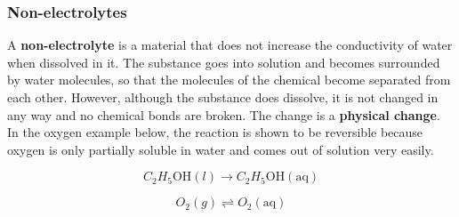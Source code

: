             \subsubsection{ Non-electrolytes}
            \nopagebreak
        \label{m38720*id339146}A \textbf{non-electrolyte} is a material that does not increase the conductivity of water when dissolved in it. The substance goes into solution and becomes surrounded by water molecules, so that the molecules of the chemical become separated from each other. However, although the substance does dissolve, it is not changed in any way and no chemical bonds are broken. The change is a \textbf{physical change}. In the oxygen example below, the reaction is shown to be reversible because oxygen is only partially soluble in water and comes out of solution very easily.\par 
        \label{m38720*id339165}\nopagebreak\noindent{}
          
    \begin{equation}
    {C}_{2}{H}_{5}\mathrm{OH}\left(l\right)\to {C}_{2}{H}_{5}\mathrm{OH}\left(\mathrm{aq}\right)\tag{17.7}
      \end{equation}
        \label{m38720*id339233}\nopagebreak\noindent{}
          
    \begin{equation}
    {O}_{2}\left(g\right)⇌{O}_{2}\left(\mathrm{aq}\right)\tag{17.8}
      \end{equation}
      \label{m38720*uid56}
